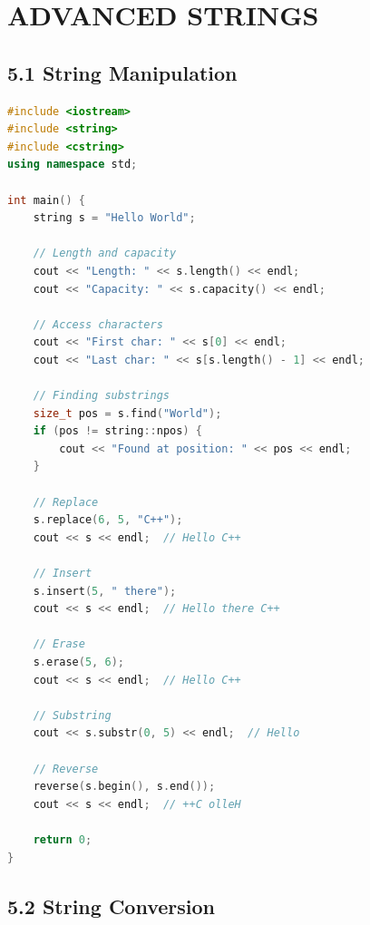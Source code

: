 \hypertarget{advanced-strings}{%
\chapter{ADVANCED STRINGS}\label{advanced-strings}}

\hypertarget{string-manipulation}{%
\section{5.1 String Manipulation}\label{string-manipulation}}

\begin{lstlisting}[language={C++}]
#include <iostream>
#include <string>
#include <cstring>
using namespace std;

int main() {
    string s = "Hello World";
    
    // Length and capacity
    cout << "Length: " << s.length() << endl;
    cout << "Capacity: " << s.capacity() << endl;
    
    // Access characters
    cout << "First char: " << s[0] << endl;
    cout << "Last char: " << s[s.length() - 1] << endl;
    
    // Finding substrings
    size_t pos = s.find("World");
    if (pos != string::npos) {
        cout << "Found at position: " << pos << endl;
    }
    
    // Replace
    s.replace(6, 5, "C++");
    cout << s << endl;  // Hello C++
    
    // Insert
    s.insert(5, " there");
    cout << s << endl;  // Hello there C++
    
    // Erase
    s.erase(5, 6);
    cout << s << endl;  // Hello C++
    
    // Substring
    cout << s.substr(0, 5) << endl;  // Hello
    
    // Reverse
    reverse(s.begin(), s.end());
    cout << s << endl;  // ++C olleH
    
    return 0;
}
\end{lstlisting}

\hypertarget{string-conversion}{%
\section{5.2 String Conversion}\label{string-conversion}}

